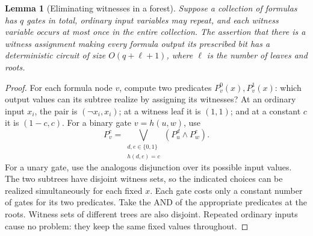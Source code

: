 \documentclass[11pt]{article}
\newtheorem{lemma}[theorem]{Lemma}
\theoremstyle{definition}
\theoremstyle{remark}
\newcommand{\B}{\{0,1\}}
\newcommand{\OR}{\bigvee}
\begin{document}
\begin{lemma}[Eliminating witnesses in a forest]\label{lem:forest}
Suppose a collection of formulas has $q$ gates in total, ordinary input
variables may repeat, and each witness variable occurs at most once
in the entire collection. The assertion that there is a witness
assignment making every formula output its prescribed bit has a
deterministic circuit of size $O(q+\ell+1)$, where $\ell$ is the
number of leaves and roots.
\end{lemma}
\begin{proof}
For each formula node $v$, compute two predicates $P_v^0(x),P_v^1(x)$:
which output values can its subtree realize by assigning its witnesses?
At an ordinary input $x_i$, the pair is $(\neg x_i,x_i)$; at a witness
leaf it is $(1,1)$; and at a constant $c$ it is $(1-c,c)$.
For a binary gate $v=h(u,w)$, use
\begin{equation}\label{eq:possible-values}
 P_v^c=\OR_{\substack{d,e\in\B\\h(d,e)=c}}
                    (P_u^d\land P_w^e).
\end{equation}
For a unary gate, use the analogous disjunction over its possible
input values.
The two subtrees have disjoint witness sets, so the indicated choices
can be realized simultaneously for each fixed $x$. Each gate costs
only a constant number of gates for its two predicates. Take the AND
of the appropriate predicates at the roots. Witness sets of different
trees are also disjoint. Repeated ordinary inputs cause no problem:
they keep the same fixed values throughout.
\end{proof}
\end{document}
